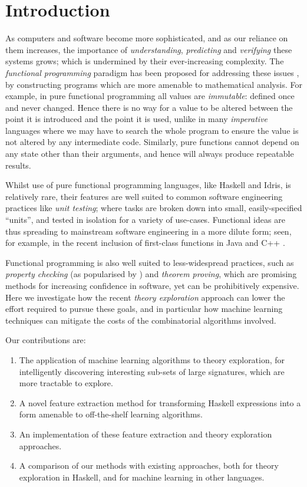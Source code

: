 \section{Introduction}

As computers and software become more sophisticated, and as our reliance on them increases, the importance of \emph{understanding}, \emph{predicting} and \emph{verifying} these systems grows; which is undermined by their ever-increasing complexity. The \emph{functional programming} paradigm has been proposed for addressing these issues \citep{hughes1989functional}, by constructing programs which are more amenable to mathematical analysis. \iffalse TODO: Types? \fi For example, in pure functional programming all values are \emph{immutable}: defined once and never changed. Hence there is no way for a value to be altered between the point it is introduced and the point it is used, unlike in many \emph{imperative} languages where we may have to search the whole program to ensure the value is not altered by any intermediate code. Similarly, pure functions cannot depend on any state other than their arguments, and hence will always produce repeatable results.

Whilst use of pure functional programming languages, like Haskell and Idris, is relatively rare, their features are well suited to common software engineering practices like \emph{unit testing}; where tasks are broken down into small, easily-specified ``units'', and tested in isolation for a variety of use-cases. Functional ideas are thus spreading to mainstream software engineering in a more dilute form; seen, for example, in the recent inclusion of first-class functions in Java \citep{gosling2015java} and C++ \citep{willcock2006lambda}.

Functional programming is also well suited to less-widespread practices, such as \emph{property checking} (as popularised by \qcheck{}) and \emph{theorem proving}, which are promising methods for increasing confidence in software, yet can be prohibitively expensive. Here we investigate how the recent \emph{theory exploration} approach can lower the effort required to pursue these goals, and in particular how machine learning techniques can mitigate the costs of the combinatorial algorithms involved.

Our contributions are:

\begin{enumerate}
  \item The application of machine learning algorithms to theory exploration, for intelligently discovering interesting sub-sets of large signatures, which are more tractable to explore.
  \item A novel feature extraction method for transforming Haskell expressions into a form amenable to off-the-shelf learning algorithms.
  \item An implementation of these feature extraction and theory exploration approaches.
  \item A comparison of our methods with existing approaches, both for theory exploration in Haskell, and for machine learning in other languages.
\end{enumerate}

